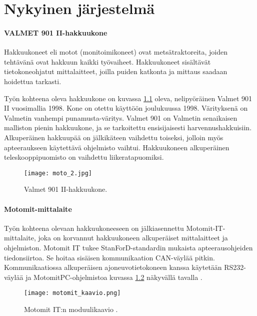 \newpage

\chapter{Nykyinen järjestelmä}

\subsubsection{VALMET 901 II-hakkuukone}
Hakkuukoneet eli motot (monitoimikoneet) ovat metsätraktoreita, joiden tehtävänä ovat hakkuun kaikki työvaiheet. Hakkuukoneet sisältävät tietokoneohjatut mittalaitteet, joilla puiden katkonta ja mittaus saadaan hoidettua tarkasti.

Työn kohteena oleva hakkuukone on kuvassa \ref{hakkuukone} oleva, nelipyöräinen Valmet 901 II vuosimallia 1998. Kone on otettu käyttöön joulukuussa 1998. Värityksenä on Valmetin vanhempi punamusta-väritys. Valmet 901 on Valmetin senaikaisen malliston pienin hakkuukone, ja se tarkoitettu ensisijaisesti harvennushakkuisiin. Alkuperäinen hakkuupää on jälkikäteen vaihdettu toiseksi, jolloin myös apteeraukseen käytettävä ohjelmisto vaihtui. Hakkuukoneen alkuperäinen teleskooppipuomisto on vaihdettu liikeratapuomiksi.
\newline

\begin{figure}[H]
\centering
\texttt{[image: moto\_2.jpg]}
\caption{Valmet 901 II-hakkuukone.}
\label{hakkuukone}
\end{figure}

\subsubsection{Motomit-mittalaite}
Työn kohteena olevaan hakkuukoneeseen on jälkiasennettu Motomit-IT-mittalaite, joka on korvannut hakkuukoneen alkuperäiset mittalaitteet ja ohjelmiston. Motomit IT tukee StanForD-standardin mukaista apteerausohjeiden tiedonsiirtoa. Se hoitaa sisäisen kommunikaation CAN-väylää pitkin. Kommunikaatiossa alkuperäisen ajoneuvotietokoneen kanssa käytetään RS232-väylää ja MotomitPC-ohjelmistoa kuvassa \ref{motomit:modulikaavio} näkyvällä tavalla \cite{motomit:esite}.
\newline

\begin{figure}[H]
\centering
\texttt{[image: motomit\_kaavio.png]}
\caption{Motomit IT:n moduulikaavio \cite{motomit:manual}.}
\label{motomit:modulikaavio}
\end{figure}
\newpage


